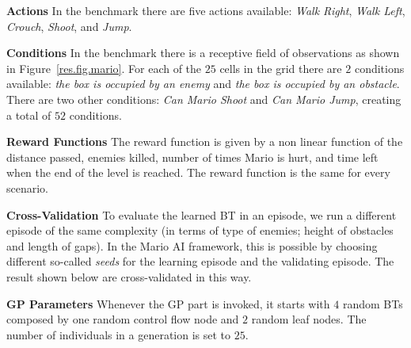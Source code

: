 
\textbf{Actions}
In the benchmark there are five actions available: \emph{Walk Right}, \emph{Walk Left}, \emph{Crouch}, \emph{Shoot}, and \emph{Jump}.

\textbf{Conditions}
In the benchmark there is a receptive field of observations as shown in Figure~\ref{res.fig.mario}. For each of the $25$ cells in the grid there are $2$ conditions available: \emph{the box is occupied by an enemy} and  \emph{the box is occupied by an obstacle}. There are two other conditions: \emph{Can Mario Shoot} and \emph{Can Mario Jump},
creating  a total of $52$ conditions.


\textbf{Reward Functions}
The reward function is given by a non linear function of the distance passed, enemies killed, number of times Mario is hurt, and time left when the end of the level is reached. The reward function is the same for every scenario.

{
\textbf{Cross-Validation}
To evaluate the learned BT in an episode, we run a different episode of the same complexity (in terms of type of enemies; height of obstacles and length of gaps). In the Mario AI framework, this is possible by choosing different so-called \emph{seeds} for the learning episode and the validating episode. The result shown below are cross-validated in this way.
}

\textbf{GP Parameters}
Whenever the GP part is invoked, it starts with $4$ random BTs composed by one random control flow node and $2$ random leaf nodes. The  number of individuals in a generation is set to $25$.

